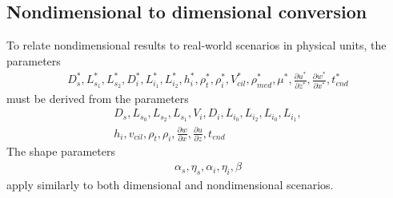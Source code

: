 \documentclass[10pt,a4paper]{article}
\def\non{\nonumber}
\def\p{\partial}
\begin{document}
\newpage 
\subsection{Nondimensional to dimensional conversion}
To relate nondimensional results to real-world scenarios in physical units, the parameters
\begin{eqnarray}\label{nd2dpars0}
	D^*_s, L^*_{s_1}, L^*_{s_2}, D^*_{i}, L^*_{i_1}, L^*_{i_2}, h^*_i, \rho^*_t, \rho^*_{i}, V^*_{cil}, \rho^*_{med}, \mu^*, \frac{\p u^*}{\p z^*}, \frac{\p w^*}{\p x^*}, t^*_{end}
\end{eqnarray}
must be derived from the parameters 
\begin{eqnarray}\label{nd2dpars1}
	D_s, L_{s_0}, L_{s_2}, L_{s_1}, V_i, D_i, L_{i_0}, L_{i_2}, L_{i_0}, L_{i_1}, \non \\
	h_i, v_{cil}, \rho_t, \rho_i, \frac{\p w}{\p x}, \frac{\p u}{\p z}, t_{end}
\end{eqnarray}
The shape parameters
\begin{eqnarray}\label{nd2dpars2}
	\alpha_s, \eta_s, \alpha_{i}, \eta_{i}, \beta
\end{eqnarray}
apply similarly to both dimensional and nondimensional scenarios.
\end{document}
